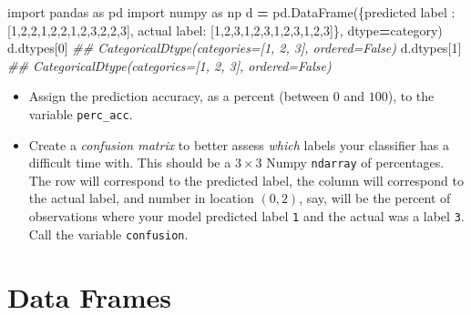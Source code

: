 \documentclass[
  12pt,
  krantz2]{krantz}
\makeatletter
\newenvironment{Shaded}{\begin{snugshade}}{\end{snugshade}}
\newcommand{\CommentTok}[1]{\textcolor[rgb]{0.37,0.37,0.37}{\textit{#1}}}
\newcommand{\DecValTok}[1]{\textcolor[rgb]{0.06,0.06,0.06}{#1}}
\newcommand{\ImportTok}[1]{#1}
\newcommand{\NormalTok}[1]{#1}
\newcommand{\OperatorTok}[1]{\textcolor[rgb]{0.43,0.43,0.43}{\textbf{#1}}}
\newcommand{\StringTok}[1]{\textcolor[rgb]{0.5,0.5,0.5}{#1}}
\providecommand{\tightlist}{%
  \setlength{\itemsep}{0pt}\setlength{\parskip}{0pt}}
\newenvironment{kframe}{%
\medskip{}
\setlength{\fboxsep}{.8em}
 \def\at@end@of@kframe{}%
 \ifinner\ifhmode%
  \def\at@end@of@kframe{\end{minipage}}%
  \begin{minipage}{\columnwidth}%
 \fi\fi%
 \def\FrameCommand##1{\hskip\@totalleftmargin \hskip-\fboxsep
 \colorbox{shadecolor}{##1}\hskip-\fboxsep
     \hskip-\linewidth \hskip-\@totalleftmargin \hskip\columnwidth}%
 \MakeFramed {\advance\hsize-\width
   \@totalleftmargin\z@ \linewidth\hsize
   \@setminipage}}%
 {\par\unskip\endMakeFramed%
 \at@end@of@kframe}
\renewenvironment{Shaded}{\begin{kframe}}{\end{kframe}}
\makeatother
\begin{document}
\begin{Shaded}
\begin{Highlighting}[]
\ImportTok{import}\NormalTok{ pandas }\ImportTok{as}\NormalTok{ pd}
\ImportTok{import}\NormalTok{ numpy }\ImportTok{as}\NormalTok{ np}
\NormalTok{d }\OperatorTok{=}\NormalTok{ pd.DataFrame(\{}\StringTok{\textquotesingle{}predicted label\textquotesingle{}}\NormalTok{ : [}\DecValTok{1}\NormalTok{,}\DecValTok{2}\NormalTok{,}\DecValTok{2}\NormalTok{,}\DecValTok{1}\NormalTok{,}\DecValTok{2}\NormalTok{,}\DecValTok{2}\NormalTok{,}\DecValTok{1}\NormalTok{,}\DecValTok{2}\NormalTok{,}\DecValTok{3}\NormalTok{,}\DecValTok{2}\NormalTok{,}\DecValTok{2}\NormalTok{,}\DecValTok{3}\NormalTok{], }
                  \StringTok{\textquotesingle{}actual label\textquotesingle{}}\NormalTok{: [}\DecValTok{1}\NormalTok{,}\DecValTok{2}\NormalTok{,}\DecValTok{3}\NormalTok{,}\DecValTok{1}\NormalTok{,}\DecValTok{2}\NormalTok{,}\DecValTok{3}\NormalTok{,}\DecValTok{1}\NormalTok{,}\DecValTok{2}\NormalTok{,}\DecValTok{3}\NormalTok{,}\DecValTok{1}\NormalTok{,}\DecValTok{2}\NormalTok{,}\DecValTok{3}\NormalTok{]\}, }
\NormalTok{                  dtype}\OperatorTok{=}\StringTok{\textquotesingle{}category\textquotesingle{}}\NormalTok{)}
\NormalTok{d.dtypes[}\DecValTok{0}\NormalTok{]}
\CommentTok{\#\# CategoricalDtype(categories=[1, 2, 3], ordered=False)}
\NormalTok{d.dtypes[}\DecValTok{1}\NormalTok{]}
\CommentTok{\#\# CategoricalDtype(categories=[1, 2, 3], ordered=False)}
\end{Highlighting}
\end{Shaded}

\begin{itemize}
\tightlist
\item
  Assign the prediction accuracy, as a percent (between \(0\) and \(100\)), to the variable \texttt{perc\_acc}.
\item
  Create a \emph{confusion matrix} to better assess \emph{which} labels your classifier has a difficult time with. This should be a \(3 \times 3\) Numpy \texttt{ndarray} of percentages. The row will correspond to the predicted label, the column will correspond to the actual label, and number in location \((0,2)\), say, will be the percent of observations where your model predicted label \texttt{1} and the actual was a label \texttt{3}. Call the variable \texttt{confusion}.
\end{itemize}

\hypertarget{data-frames}{%
\chapter{Data Frames}\label{data-frames}}
\end{document}
